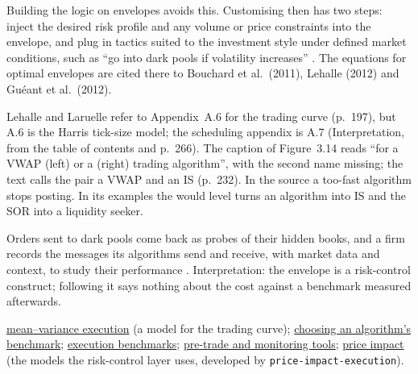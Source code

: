 \begin{qfdefinition}
Building the logic on envelopes avoids this. Customising then has two steps: inject the desired risk profile and any volume or price constraints into the envelope, and plug in tactics suited to the investment style under defined market conditions, such as ``go into dark pools if volatility increases'' \citep[sec.~3.4.1, pp.~231--233]{alpha-laruelle}. The equations for optimal envelopes are cited there to Bouchard et al.\ (2011), Lehalle (2012) and Guéant et al.\ (2012).

 Lehalle and Laruelle refer to Appendix~A.6 for the trading curve (p.~197), but A.6 is the Harris tick-size model; the scheduling appendix is A.7 (Interpretation, from the table of contents and p.~266). The caption of Figure~3.14 reads ``for a VWAP (left) or a (right) trading algorithm'', with the second name missing; the text calls the pair a VWAP and an IS (p.~232). In the source a too-fast algorithm stops posting. In its examples the would level turns an algorithm into IS and the SOR into a liquidity seeker.

Orders sent to dark pools come back as probes of their hidden books, and a firm records the messages its algorithms send and receive, with market data and context, to study their performance \citep[sec.~3.1.1, p.~196]{alpha-laruelle}. Interpretation: the envelope is a risk-control construct; following it says nothing about the cost against a benchmark measured afterwards.

 \hyperref[mod:almgren-chriss-execution]{mean--variance execution} (a model for the trading curve); \hyperref[meth:algorithm-benchmark-choice]{choosing an algorithm's benchmark}; \hyperref[def:execution-benchmark]{execution benchmarks}; \hyperref[meth:execution-decision-support]{pre-trade and monitoring tools}; \hyperref[def:price-impact]{price impact} (the models the risk-control layer uses, developed by \nolinkurl{price-impact-execution}).

\end{qfdefinition}

